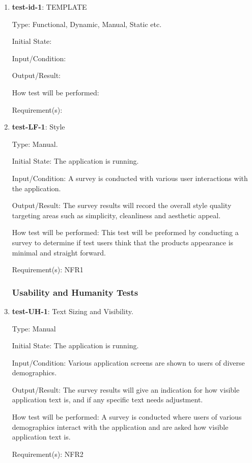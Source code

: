 \documentclass[12pt, titlepage]{article}
\begin{document}
	
	\begin{enumerate}
		
		\item{\textbf{test-id-1}}: TEMPLATE
		
		Type: Functional, Dynamic, Manual, Static etc.
		
		Initial State: 
		
		Input/Condition: 
		
		Output/Result: 
		
		How test will be performed: 
		
		Requirement(s):
			
		\item{\textbf{test-LF-1}}: Style

		Type: Manual.
		
		Initial State: The application is running.
		
		Input/Condition: A survey is conducted with various user interactions with the application. 
		
		Output/Result: The survey results will record the overall style quality targeting areas such as simplicity, cleanliness and aesthetic appeal. 
		
		How test will be performed: This test will be preformed by conducting a survey to determine if test users think that the products appearance is minimal and straight forward.
		
		Requirement(s): NFR1
		
		

	
	\subsubsection{Usability and Humanity Tests}
		\item{\textbf{test-UH-1}}: Text Sizing and Visibility.
		
		Type: Manual
		
		Initial State: The application is running.
		
		Input/Condition: Various application screens are shown to users of diverse demographics.
		
		Output/Result: The survey results will give an indication for how visible application text is, and if any specific text needs adjustment.
		
		How test will be performed: A survey is conducted where users of various demographics interact with the application and are asked how visible application text is.
		
		Requirement(s): NFR2
		

\end{enumerate}
\end{document}
